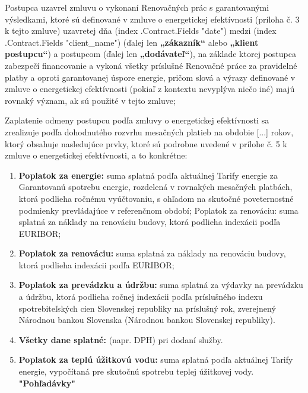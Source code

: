 \documentclass[a4paper]{article}
\begin{document}
\vspace{5mm}

Postupca uzavrel zmluvu o vykonaní Renovačných prác s garantovanými výsledkami,
ktoré sú definované v zmluve o energetickej efektívnosti (príloha č. 3 k tejto zmluve)
uzavretej dňa ({{index .Contract.Fields "date"}}) medzi ({{index .Contract.Fields "client_name"}}) 
(ďalej len \textbf{„zákazník“} alebo \textbf{„klient postupcu“}) a postupcom (ďalej len \textbf{„dodávateľ“}), 
na základe ktorej postupca zabezpečí financovanie a vykoná všetky príslušné Renovačné 
práce za pravidelné platby a oproti garantovanej úspore energie, pričom slová a výrazy
definované v zmluve o energetickej efektívnosti (pokiaľ z kontextu nevyplýva niečo iné) 
majú rovnaký význam, ak sú použité v tejto zmluve;\par
\vspace{5mm}

Zaplatenie odmeny postupcu podľa zmluvy o energetickej efektívnosti sa zrealizuje podľa 
dohodnutého rozvrhu mesačných platieb na obdobie [...] rokov, ktorý obsahuje nasledujúce 
prvky, ktoré sú podrobne uvedené v prílohe č. 5 k zmluve o energetickej efektívnosti, a to
konkrétne:\par

\vspace{5mm}

\begin{enumerate}
\item{\textbf{Poplatok za energie:}  suma splatná podľa aktuálnej Tarify energie za Garantovanú spotrebu energie, rozdelená v rovnakých mesačných platbách, ktorá podlieha ročnému vyúčtovaniu, s ohľadom na skutočné poveternostné podmienky prevládajúce v referenčnom období;
Poplatok za renováciu: suma splatná za náklady na renováciu budovy, ktorá podlieha indexácii podľa EURIBOR;}

\item{\textbf{Poplatok za renováciu:} suma splatná za náklady na renováciu budovy, ktorá podlieha indexácii podľa EURIBOR;}

\item{\textbf{Poplatok za prevádzku a údržbu:} suma splatná za výdavky na prevádzku a údržbu, ktorá podlieha ročnej indexácii podľa príslušného indexu spotrebiteľských cien Slovenskej republiky na príslušný rok, zverejnený Národnou bankou Slovenska (Národnou bankou Slovenskej republiky).}

\item{\textbf{Všetky dane splatné:} (napr. DPH) pri dodaní služby.
}

\item{\textbf{Poplatok za teplú úžitkovú vodu:} suma splatná podľa aktuálnej Tarify energie, vypočítaná pre skutočnú spotrebu teplej úžitkovej vody.
    \textbf{"Pohľadávky"}}
\end{enumerate}
\end{document}

